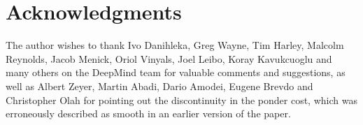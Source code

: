 \documentclass[10pt]{article}
\begin{document}
\section*{Acknowledgments} 
The author wishes to thank Ivo Danihleka, Greg Wayne, Tim Harley, Malcolm Reynolds, Jacob Menick, Oriol Vinyals, Joel Leibo, Koray Kavukcuoglu and many others on the DeepMind team for valuable comments and suggestions, as well as Albert Zeyer, Martin Abadi, Dario Amodei, Eugene Brevdo and Christopher Olah for pointing out the discontinuity in the ponder cost, which was erroneously described as smooth in an earlier version of the paper.


 
                                                        
\end{document}
